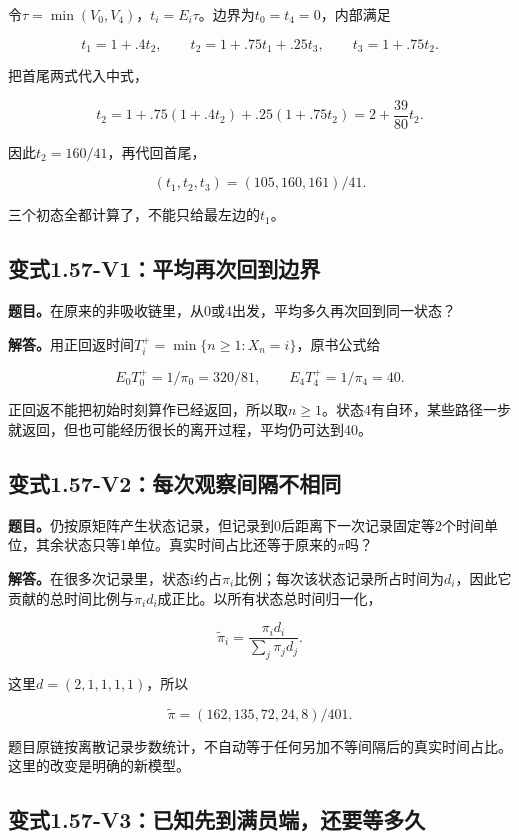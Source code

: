 \documentclass[
  11pt,
  a4paper,
  UTF8,
  fontset=fandol]{ctexart}
\begin{document}
令\(\tau=\min(V_0,V_4)\)，\(t_i=E_i\tau\)。边界为\(t_0=t_4=0\)，内部满足

\[
t_1=1+.4t_2,\qquad
 t_2=1+.75t_1+.25t_3,\qquad
 t_3=1+.75t_2.
\]

把首尾两式代入中式，

\[
t_2=1+.75(1+.4t_2)+.25(1+.75t_2)
=2+\frac{39}{80}t_2.
\]

因此\(t_2=160/41\)，再代回首尾，

\[
\boxed{(t_1,t_2,t_3)=(105,160,161)/41.}
\]

三个初态全都计算了，不能只给最左边的\(t_1\)。

\subsection{变式1.57-V1：平均再次回到边界}\label{ux53d8ux5f0f1.57-v1ux5e73ux5747ux518dux6b21ux56deux5230ux8fb9ux754c}

\textbf{题目。}在原来的非吸收链里，从0或4出发，平均多久再次回到同一状态？

\textbf{解答。}用正回返时间\(T_i^+=\min\{n\ge1:X_n=i\}\)，原书公式给

\[
\boxed{E_0T_0^+=1/\pi_0=320/81,\qquad E_4T_4^+=1/\pi_4=40.}
\]

正回返不能把初始时刻算作已经返回，所以取\(n\ge1\)。状态4有自环，某些路径一步就返回，但也可能经历很长的离开过程，平均仍可达到40。

\subsection{变式1.57-V2：每次观察间隔不相同}\label{ux53d8ux5f0f1.57-v2ux6bcfux6b21ux89c2ux5bdfux95f4ux9694ux4e0dux76f8ux540c}

\textbf{题目。}仍按原矩阵产生状态记录，但记录到0后距离下一次记录固定等2个时间单位，其余状态只等1单位。真实时间占比还等于原来的\(\pi\)吗？

\textbf{解答。}在很多次记录里，状态i约占\(\pi_i\)比例；每次该状态记录所占时间为\(d_i\)，因此它贡献的总时间比例与\(\pi_i d_i\)成正比。以所有状态总时间归一化，

\[
\widetilde\pi_i=\frac{\pi_i d_i}{\sum_j\pi_jd_j}.
\]

这里\(d=(2,1,1,1,1)\)，所以

\[
\boxed{\widetilde\pi=(162,135,72,24,8)/401.}
\]

题目原链按离散记录步数统计，不自动等于任何另加不等间隔后的真实时间占比。这里的改变是明确的新模型。

\subsection{变式1.57-V3：已知先到满员端，还要等多久}\label{ux53d8ux5f0f1.57-v3ux5df2ux77e5ux5148ux5230ux6ee1ux5458ux7aefux8fd8ux8981ux7b49ux591aux4e45}
\end{document}
